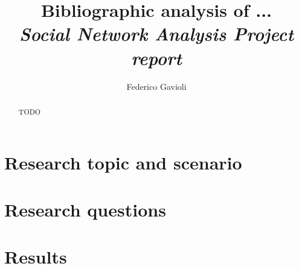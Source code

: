 \documentclass{article}
\title{\textbf{Bibliographic analysis of ...} \\ \textit{\normalsize{Social Network Analysis Project report}}}
\author{Federico Gavioli}
\affil{\textit{federico.gavioli@unimore.it}}
\date{}
\begin{document}
\maketitle

\begin{abstract}
TODO
\end{abstract}


\section{Research topic and scenario}

\section{Research questions}

\section{Results}

\end{document}
